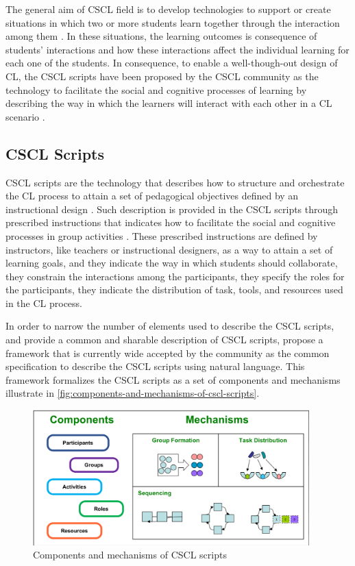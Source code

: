 The general aim of CSCL field is to develop technologies to support or create situations in which two or more students learn together through the interaction among them \cite{Dillenbourg1999}. In these situations, the learning outcomes is consequence of students' interactions and how these interactions affect the individual learning for each one of the students. In consequence, to enable a well-though-out design of CL, the CSCL scripts have been proposed by the CSCL community as the technology to facilitate the social and cognitive processes of learning by describing the way in which the learners will interact with each other in a CL scenario \cite{HarrerKobbeMalzahn2007}.

\subsection{CSCL Scripts}
\label{sec:cscl-scripts}

CSCL scripts are the technology that describes how to structure and orchestrate the CL process to attain a set of pedagogical objectives defined by an instructional design \cite{DillenbourgJermann2007}. Such description is provided in the CSCL scripts through prescribed instructions that indicates how to facilitate the social and cognitive processes in group activities \cite{Dillenbourg2002}. These prescribed instructions are defined by instructors, like teachers or instructional designers, as a way to attain a set of learning goals, and they indicate the way in which students should collaborate, they constrain the interactions among the participants, they specify the roles for the participants, they indicate the distribution of task, tools, and resources used in the CL process.

In order to narrow the number of elements used to describe the CSCL scripts, and provide a common and sharable description of CSCL scripts,  propose a framework that is currently wide accepted by the community as the common specification to describe the CSCL scripts using natural language. This framework formalizes the CSCL scripts as a set of components and mechanisms illustrate in \autoref{fig:components-and-mechanisms-of-cscl-scripts}.


\begin{figure}[htb]
 \caption{Components and mechanisms of CSCL scripts}
 \label{fig:components-and-mechanisms-of-cscl-scripts}
 \centering
 \includegraphics[width=0.95\textwidth]{images/chap-general-background/components-and-mechanisms-of-cscl-scripts}
\end{figure}

